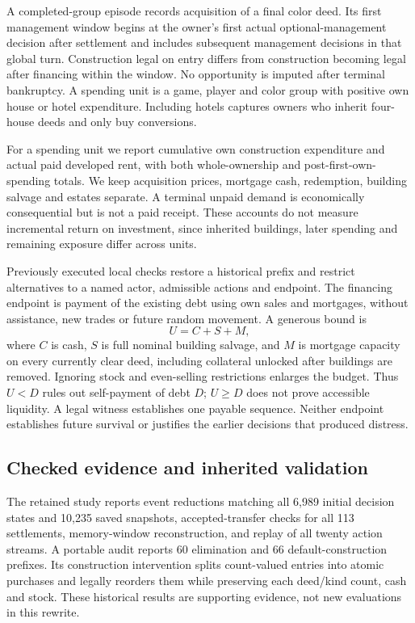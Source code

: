 \documentclass[11pt,letterpaper]{article}
\begin{document}
A completed-group episode records acquisition of a final color deed. Its first management window begins at the owner's first actual optional-management decision after settlement and includes subsequent management decisions in that global turn. Construction legal on entry differs from construction becoming legal after financing within the window. No opportunity is imputed after terminal bankruptcy. A spending unit is a game, player and color group with positive own house or hotel expenditure. Including hotels captures owners who inherit four-house deeds and only buy conversions.

For a spending unit we report cumulative own construction expenditure and actual paid developed rent, with both whole-ownership and post-first-own-spending totals. We keep acquisition prices, mortgage cash, redemption, building salvage and estates separate. A terminal unpaid demand is economically consequential but is not a paid receipt. These accounts do not measure incremental return on investment, since inherited buildings, later spending and remaining exposure differ across units.

Previously executed local checks restore a historical prefix and restrict alternatives to a named actor, admissible actions and endpoint. The financing endpoint is payment of the existing debt using own sales and mortgages, without assistance, new trades or future random movement. A generous bound is
\begin{equation}
 U=C+S+M,
\end{equation}
where $C$ is cash, $S$ is full nominal building salvage, and $M$ is mortgage capacity on every currently clear deed, including collateral unlocked after buildings are removed. Ignoring stock and even-selling restrictions enlarges the budget. Thus $U<D$ rules out self-payment of debt $D$; $U\geq D$ does not prove accessible liquidity. A legal witness establishes one payable sequence. Neither endpoint establishes future survival or justifies the earlier decisions that produced distress.

\subsection{Checked evidence and inherited validation}

The retained study reports event reductions matching all 6,989 initial decision states and 10,235 saved snapshots, accepted-transfer checks for all 113 settlements, memory-window reconstruction, and replay of all twenty action streams. A portable audit reports 60 elimination and 66 default-construction prefixes. Its construction intervention splits count-valued entries into atomic purchases and legally reorders them while preserving each deed/kind count, cash and stock. These historical results are supporting evidence, not new evaluations in this rewrite.
\end{document}
